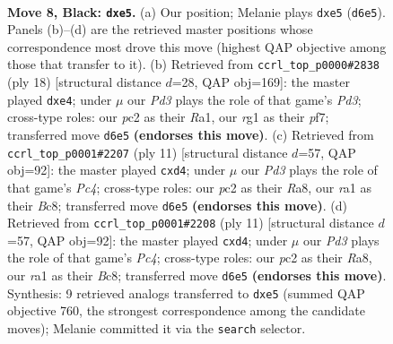 \documentclass[11pt]{article}
\begin{document}
\begin{figure}[p]\centering
\begin{subfigure}{0.46\textwidth}\centering
\resizebox{\linewidth}{!}{%
\newchessgame
\chessboard[
  setfen={r1bqk2r/ppp1ppbp/1nnp2p1/4P3/3P4/1B3N2/PPP1KPPP/RNBQ2R1 b kq - 7 8},
  showmover=false,
  pgfstyle=straightmove, color=movearrow, markmove={d6-e5}
]}
\caption{}
\end{subfigure}\hfill
\begin{subfigure}{0.46\textwidth}\centering
\resizebox{\linewidth}{!}{%
\newchessgame
\chessboard[
  setfen={rnbq1rk1/pp3ppp/1b3n2/3p4/4p3/1NNP2P1/PP2PPBP/R1BQK2R w KQ - 5 10},
  showmover=false,
  pgfstyle=straightmove, color=movearrow, markmove={d3-e4}
]}
\caption{}
\end{subfigure}
\\[4pt]
\begin{subfigure}{0.46\textwidth}\centering
\resizebox{\linewidth}{!}{%
\newchessgame
\chessboard[
  setfen={r1bqkb1r/1p2pppp/p1np1n2/2p5/P2PP3/2N2N1P/1PP2PP1/R1BQKB1R b KQkq - 0 6},
  showmover=false,
  pgfstyle=straightmove, color=movearrow, markmove={c5-d4}
]}
\caption{}
\end{subfigure}\hfill
\begin{subfigure}{0.46\textwidth}\centering
\resizebox{\linewidth}{!}{%
\newchessgame
\chessboard[
  setfen={r1bqkb1r/1p2pppp/p1np1n2/2p5/P2PP3/2N2N1P/1PP2PP1/R1BQKB1R b KQkq - 0 6},
  showmover=false,
  pgfstyle=straightmove, color=movearrow, markmove={c5-d4}
]}
\caption{}
\end{subfigure}
\caption{\textbf{Move 8, Black: \texttt{dxe5}.} (a) Our position; Melanie plays \texttt{dxe5} (\texttt{d6e5}). Panels (b)--(d) are the retrieved master positions whose correspondence most drove this move (highest QAP objective among those that transfer to it). (b) Retrieved from \texttt{ccrl\_top\_p0000\#2838} (ply 18) [structural distance $d$=28, QAP obj=169]: the master played \texttt{dxe4}; under $\mu$ our \emph{Pd3} plays the role of that game's \emph{Pd3}; cross-type roles: our \emph{p}c2 as their \emph{R}a1, our \emph{r}g1 as their \emph{p}f7; transferred move \texttt{d6e5} \textbf{(endorses this move)}. (c) Retrieved from \texttt{ccrl\_top\_p0001\#2207} (ply 11) [structural distance $d$=57, QAP obj=92]: the master played \texttt{cxd4}; under $\mu$ our \emph{Pd3} plays the role of that game's \emph{Pc4}; cross-type roles: our \emph{p}c2 as their \emph{R}a8, our \emph{r}a1 as their \emph{B}c8; transferred move \texttt{d6e5} \textbf{(endorses this move)}. (d) Retrieved from \texttt{ccrl\_top\_p0001\#2208} (ply 11) [structural distance $d$=57, QAP obj=92]: the master played \texttt{cxd4}; under $\mu$ our \emph{Pd3} plays the role of that game's \emph{Pc4}; cross-type roles: our \emph{p}c2 as their \emph{R}a8, our \emph{r}a1 as their \emph{B}c8; transferred move \texttt{d6e5} \textbf{(endorses this move)}. Synthesis: 9 retrieved analogs transferred to \texttt{dxe5} (summed QAP objective 760, the strongest correspondence among the candidate moves); Melanie committed it via the \texttt{search} selector.}
\label{fig:thought-m15}
\end{figure}
\end{document}
